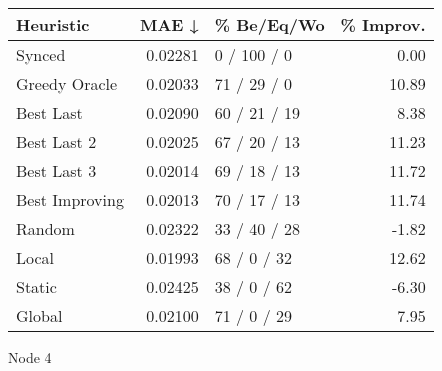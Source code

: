 \begin{tabular}{lrlr}
\toprule
\textbf{Heuristic} & \textbf{MAE ↓} & \textbf{\% Be/Eq/Wo} & \textbf{\% Improv.} \\
\midrule
            Synced &        0.02281 &          0 / 100 / 0 &                0.00 \\
     Greedy Oracle &        0.02033 &          71 / 29 / 0 &               10.89 \\
         Best Last &        0.02090 &         60 / 21 / 19 &                8.38 \\
       Best Last 2 &        0.02025 &         67 / 20 / 13 &               11.23 \\
       Best Last 3 &        0.02014 &         69 / 18 / 13 &               11.72 \\
    Best Improving &        0.02013 &         70 / 17 / 13 &               11.74 \\
            Random &        0.02322 &         33 / 40 / 28 &               -1.82 \\
             Local &        0.01993 &          68 / 0 / 32 &               12.62 \\
            Static &        0.02425 &          38 / 0 / 62 &               -6.30 \\
            Global &        0.02100 &          71 / 0 / 29 &                7.95 \\
\bottomrule
\end{tabular}
\caption{Node 4}
\label{tab:non_lr05_le2_bs4_4}
